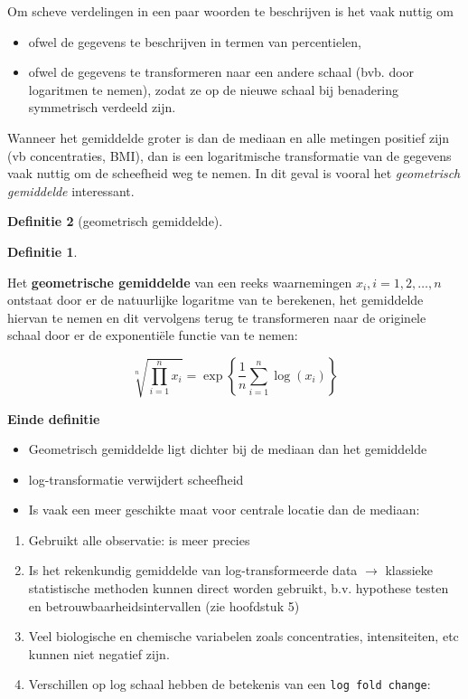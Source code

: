 \documentclass[
  12pt,dutch,coursenotes]{book}
\providecommand{\tightlist}{%
  \setlength{\itemsep}{0pt}\setlength{\parskip}{0pt}}
\theoremstyle{definition}
\newtheorem{definition}{Definitie}[chapter]
\theoremstyle{definition}
\theoremstyle{definition}
\theoremstyle{remark}
\begin{document}
Om scheve verdelingen in een paar woorden te beschrijven is het vaak nuttig
om

\begin{itemize}
\tightlist
\item
  ofwel de gegevens te beschrijven in termen van percentielen,
\item
  ofwel de gegevens te transformeren naar een andere schaal (bvb. door
  logaritmen te nemen), zodat ze op de nieuwe schaal bij benadering
  symmetrisch verdeeld zijn.
\end{itemize}

Wanneer het gemiddelde groter is dan de mediaan en alle metingen positief zijn (vb concentraties, BMI), dan is een logaritmische
transformatie van de gegevens vaak nuttig om de scheefheid weg te nemen. In
dit geval is vooral het \emph{geometrisch gemiddelde} interessant.

\begin{definition}[geometrisch gemiddelde]
\begin{definition}

\protect\hypertarget{def:unnamed-chunk-99}{}{\label{def:unnamed-chunk-99} \iffalse (geometrisch gemiddelde) \fi{} }

\end{definition}
\end{definition}

Het \textbf{geometrische gemiddelde} van een reeks waarnemingen \(x_i, i=1, 2, \dots, n\) ontstaat door er de natuurlijke logaritme van te berekenen, het
gemiddelde hiervan te nemen en dit vervolgens terug te transformeren naar de
originele schaal door er de exponentiële functie van te nemen:

\begin{equation*}
\sqrt[n]{\prod\limits_{i=1}^n x_i} = \exp\left\{\frac{1}{n} \sum_{i=1}^n \log(x_i)\right\}
\end{equation*}

\textbf{Einde definitie}

\begin{itemize}
\item
  Geometrisch gemiddelde ligt dichter bij de mediaan dan het gemiddelde
\item
  log-transformatie verwijdert scheefheid
\item
  Is vaak een meer geschikte maat voor centrale locatie dan de mediaan:
\end{itemize}

\begin{enumerate}
\def\labelenumi{\arabic{enumi}.}
\tightlist
\item
  Gebruikt alle observatie: is meer precies
\item
  Is het rekenkundig gemiddelde van log-transformeerde data \(\rightarrow\) klassieke statistische methoden kunnen direct worden gebruikt, b.v. hypothese testen en betrouwbaarheidsintervallen (zie hoofdstuk 5)
\item
  Veel biologische en chemische variabelen zoals concentraties, intensiteiten, etc kunnen niet negatief zijn.
\item
  Verschillen op log schaal hebben de betekenis van een \texttt{log\ fold\ change}:
\end{enumerate}
\end{document}
